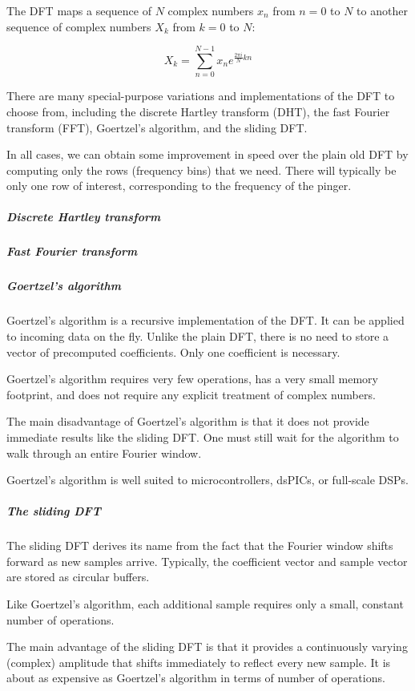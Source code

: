 \documentclass[10pt]{article}
\begin{document}
The DFT maps a sequence of \(N\) complex numbers \(x_n\) from \(n=0\) to \(N\) to another sequence of complex numbers \(X_k\) from \(k=0\) to \(N\):

\begin{equation}
X_k=\sum_{n=0}^{N-1} {x_n e^{\frac{2 \pi i}{N} kn}}
\end{equation}

There are many special-purpose variations and implementations of the DFT to choose from, including the discrete Hartley transform (DHT), the fast Fourier transform (FFT), Goertzel's algorithm, and the sliding DFT.

In all cases, we can obtain some improvement in speed over the plain old DFT by computing only the rows (frequency bins) that we need.  There will typically be only one row of interest, corresponding to the frequency of the pinger.

\subparagraph{Discrete Hartley transform}

\subparagraph{Fast Fourier transform}

\subparagraph{Goertzel's  algorithm}

Goertzel's algorithm is a recursive implementation of the DFT.   It can be applied to incoming data on the fly.  Unlike the plain DFT, there is no need to store a vector of precomputed coefficients.  Only one coefficient is necessary.

Goertzel's algorithm requires very few operations, has a very small memory footprint, and does not require any explicit treatment of complex numbers.

The main disadvantage of Goertzel's algorithm is that it does not provide immediate results like the sliding DFT.  One must still wait for the algorithm to walk through an entire Fourier window.

Goertzel's algorithm is well suited to microcontrollers, dsPICs, or full-scale DSPs.

\subparagraph{The sliding DFT}

The sliding DFT derives its name from the fact that the Fourier window shifts forward as new samples arrive.  Typically, the coefficient vector and sample vector are stored as circular buffers.

Like Goertzel's algorithm, each additional sample requires only a small, constant number of operations.

The main advantage of the sliding DFT is that it provides a continuously varying (complex) amplitude that shifts immediately to reflect every new sample.  It is about as expensive as Goertzel's algorithm in terms of number of operations.
\end{document}
